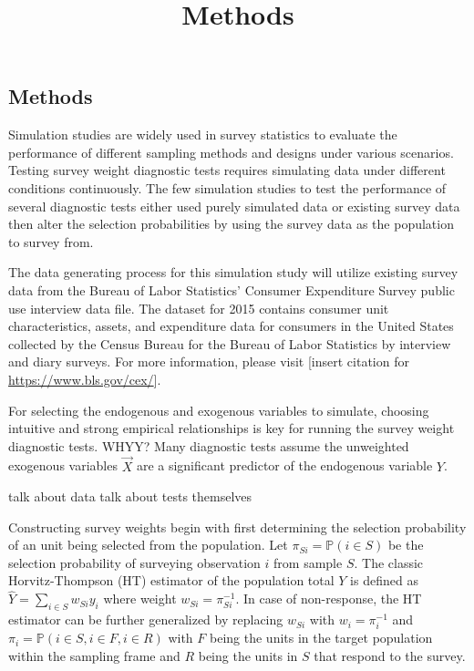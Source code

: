 \documentclass[
  letterpaper,
  DIV=11,
  numbers=noendperiod]{scrartcl}
\title{Methods}
\author{}
\date{}
\begin{document}
\maketitle
\ifdefined\Shaded\renewenvironment{Shaded}{\begin{tcolorbox}[enhanced, breakable, frame hidden, boxrule=0pt, borderline west={3pt}{0pt}{shadecolor}, sharp corners, interior hidden]}{\end{tcolorbox}}\fi

\hypertarget{methods}{%
\subsection{Methods}\label{methods}}

Simulation studies are widely used in survey statistics to evaluate the
performance of different sampling methods and designs under various
scenarios. Testing survey weight diagnostic tests requires simulating
data under different conditions continuously. The few simulation studies
to test the performance of several diagnostic tests either used purely
simulated data or existing survey data then alter the selection
probabilities by using the survey data as the population to survey from.

The data generating process for this simulation study will utilize
existing survey data from the Bureau of Labor Statistics' Consumer
Expenditure Survey public use interview data file. The dataset for 2015
contains consumer unit characteristics, assets, and expenditure data for
consumers in the United States collected by the Census Bureau for the
Bureau of Labor Statistics by interview and diary surveys. For more
information, please visit {[}insert citation for
\url{https://www.bls.gov/cex/}{]}.

For selecting the endogenous and exogenous variables to simulate,
choosing intuitive and strong empirical relationships is key for running
the survey weight diagnostic tests. WHYY? Many diagnostic tests assume
the unweighted exogenous variables \(\vec{X}\) are a significant
predictor of the endogenous variable \(Y\).

talk about data talk about tests themselves

Constructing survey weights begin with first determining the selection
probability of an unit being selected from the population. Let
\(\pi_{Si} = \mathbb{P}(i \in S)\) be the selection probability of
surveying observation \(i\) from sample \(S\). The classic
Horvitz-Thompson (HT) estimator of the population total \(Y\) is defined
as \(\hat{Y} = \sum_{i \in S} w_{Si} y_i\) where weight
\(w_{Si} = \pi_{Si}^{-1}\). In case of non-response, the HT estimator
can be further generalized by replacing \(w_{Si}\) with
\(w_i = \pi_i^{-1}\) and
\(\pi_{i} = \mathbb{P}(i \in S, i \in F, i \in R)\) with \(F\) being the
units in the target population within the sampling frame and \(R\) being
the units in \(S\) that respond to the survey.
\end{document}
